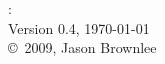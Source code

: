 


\begin{flushleft}
%
\mybooktitle: \mybooksubtitle \\
Version 0.4, \today \\
\copyright\ 2009, Jason Brownlee \\
%
\end{flushleft}

\hfill


	
\vfill\vfill\vfill